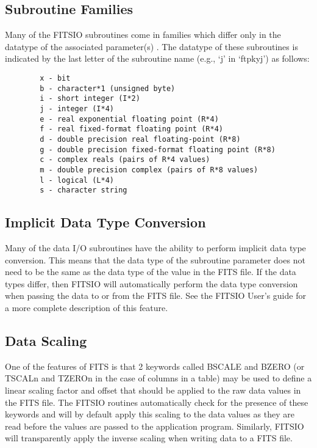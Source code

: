 \subsection{Subroutine Families}
Many of the FITSIO subroutines come in families which differ only in the
datatype of the associated parameter(s) .  The datatype of these
subroutines is indicated by the last letter of the subroutine name
(e.g., `j' in `ftpkyj') as follows:

\noindent
\begin{verbatim}
        x - bit
        b - character*1 (unsigned byte)
        i - short integer (I*2)
        j - integer (I*4)
        e - real exponential floating point (R*4)
        f - real fixed-format floating point (R*4)
        d - double precision real floating-point (R*8)
        g - double precision fixed-format floating point (R*8)
        c - complex reals (pairs of R*4 values)
        m - double precision complex (pairs of R*8 values)
        l - logical (L*4)
        s - character string
\end{verbatim}

\subsection{Implicit Data Type Conversion}

Many of the data I/O subroutines have the ability to perform implicit
data type conversion.  This means that the data type of the subroutine
parameter does not need to be the same as the data type of the value in
the FITS file.  If the data types differ, then FITSIO will automatically
perform the data type conversion when passing the data to or from the
FITS file.  See the FITSIO User's guide for a more complete description
of this feature.

\subsection{Data Scaling}

One of the features of FITS is that 2 keywords called BSCALE and BZERO
(or TSCALn and TZEROn in the case of columns in a table) may be used to
define a linear scaling factor and offset that should be applied to the
raw data values in the FITS file.  The FITSIO routines  automatically
check for the presence of these keywords and will by default apply this
scaling to the data values as they are read before the values are
passed to the application program. Similarly, FITSIO will transparently
apply the inverse scaling when writing data to a FITS file.

